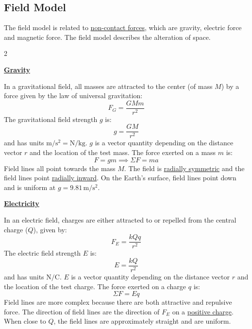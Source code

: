 \documentclass{article}
\begin{document}
\subsection{Field Model}

The field model is related to \ul{non-contact forces}, which are gravity, electric force and magnetic force. The field model describes the alteration of space.

\setlength{\columnsep}{0.6in}
\setlength{\columnseprule}{0.4pt}
\begin{minipage}{\textwidth}
\begin{multicols*}{2}
	\begin{center}
		\ul{\textbf{Gravity}}
	\end{center}

	In a gravitational field, all masses are attracted to the center (of mass $M$) by a force given by the law of universal gravitation:
	\begin{equation*}
	    F_G=\frac{GMm}{r^2}
	\end{equation*}
	The gravitational field strength $g$ is:
	\begin{equation*}
	    g=\frac{GM}{r^2}
	\end{equation*}
	and has units $\si{\meter/\second^2}=\si{\newton/\kilo\gram}$. $g$ is a vector quantity depending on the distance vector $r$ and the location of the test mass. The force exerted on a mass $m$ is:
	\begin{equation*}
	    F=gm \implies \Sigma F=ma
	\end{equation*}
	Field lines all point towards the mass $M$. The field is \ul{radially symmetric} and the field lines point \ul{radially inward}. On the Earth's surface, field lines point down and is uniform at $g=9.81\,\si{\meter/\second^2}$.
	
	\vfill\null\columnbreak

	\begin{center}
		\ul{\textbf{Electricity}}
	\end{center}
	In an electric field, charges are either attracted to or repelled from the central charge ($Q$), given by:
	\begin{equation*}
		F_E=\frac{kQq}{r^2}
	\end{equation*}
	\newline The electric field strength $E$ is:
	\begin{equation*}
		E=\frac{kQ}{r^2}
	\end{equation*}
	and has units $\si{\newton/\coulomb}$. $E$ is a vector quantity depending on the distance vector $r$ and the location of the test charge. The force exerted on a charge $q$ is:
	\begin{equation*}
		\Sigma F=Eq
	\end{equation*}
	Field lines are more complex because there are both attractive and repulsive force. The direction of field lines are the direction of $F_E$ on a \ul{positive charge}. When close to $Q$, the field lines are approximately straight and are uniform.
\end{multicols*}
\end{minipage}
\end{document}
